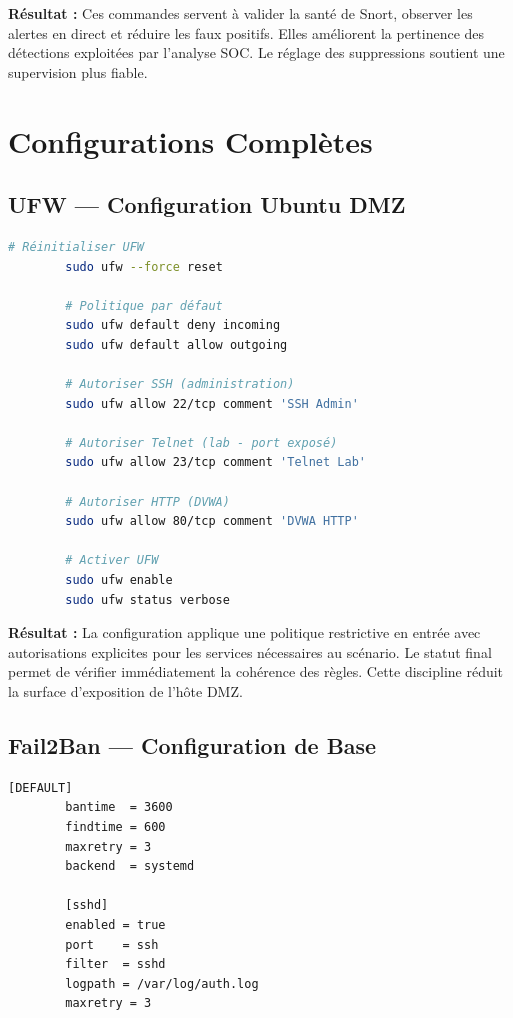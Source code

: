 \documentclass[12pt,a4paper,openany]{report}
\begin{document}
	\textbf{Résultat :} Ces commandes servent à valider la santé de Snort, observer les alertes en direct et réduire les faux positifs. Elles améliorent la pertinence des détections exploitées par l’analyse SOC. Le réglage des suppressions soutient une supervision plus fiable.
	
	\section{Configurations Complètes}
	\label{sec:app-configs}
	
	\subsection{UFW — Configuration Ubuntu DMZ}
	\begin{lstlisting}[language=bash, caption={Configuration UFW pour le serveur DMZ Ubuntu}]
		# Réinitialiser UFW
		sudo ufw --force reset
		
		# Politique par défaut
		sudo ufw default deny incoming
		sudo ufw default allow outgoing
		
		# Autoriser SSH (administration)
		sudo ufw allow 22/tcp comment 'SSH Admin'
		
		# Autoriser Telnet (lab - port exposé)
		sudo ufw allow 23/tcp comment 'Telnet Lab'
		
		# Autoriser HTTP (DVWA)
		sudo ufw allow 80/tcp comment 'DVWA HTTP'
		
		# Activer UFW
		sudo ufw enable
		sudo ufw status verbose
	\end{lstlisting}
	
	\textbf{Résultat :} La configuration applique une politique restrictive en entrée avec autorisations explicites pour les services nécessaires au scénario. Le statut final permet de vérifier immédiatement la cohérence des règles. Cette discipline réduit la surface d’exposition de l’hôte DMZ.
	
	\subsection{Fail2Ban — Configuration de Base}
	\begin{lstlisting}[language=bash, caption={/etc/fail2ban/jail.local — Configuration SSH}]
		[DEFAULT]
		bantime  = 3600
		findtime = 600
		maxretry = 3
		backend  = systemd
		
		[sshd]
		enabled = true
		port    = ssh
		filter  = sshd
		logpath = /var/log/auth.log
		maxretry = 3
	\end{lstlisting}
	
\end{document}
